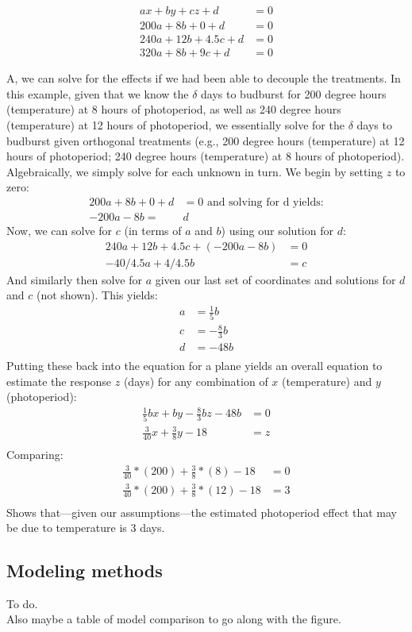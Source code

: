\documentclass[11pt]{article}
\begin{document}
\begin{align}
ax+by+cz+d & =0\\
200a + 8b + 0 + d &= 0\\
240a + 12b+4.5c + d &=0\\
320a + 8b + 9c+ d &=0
\end{align}

A, we can solve for the effects if we had been able to decouple the treatments. In this example, given that we know the $\delta$ days to budburst for 200 degree hours (temperature) at 8 hours of photoperiod, as well as 240 degree hours (temperature) at 12 hours of photoperiod, we essentially solve for the $\delta$ days to budburst given orthogonal treatments (e.g., 200 degree hours (temperature) at 12 hours of photoperiod; 240 degree hours (temperature) at 8 hours of photoperiod). \\

Algebraically, we simply solve for each unknown in turn. We begin by setting $z$ to zero:
\begin{align}
200a + 8b + 0 + d & = 0 \text{ and solving for d yields:} \\
-200a - 8b = & d  %
\end{align}
Now, we can solve for $c$ (in terms of $a$ and $b$) using our solution for $d$:
\begin{align}
240a+12b+4.5c+(-200a - 8b) &=0\\
-40/4.5a+4/4.5b & = c%
\end{align}
And similarly then solve for $a$ given our last set of coordinates and solutions for $d$ and $c$ (not shown). This yields:
\begin{align}
a & =\frac{1}{5}b\\
c & =-\frac{8}{3}b\\
d & =-48b\\
\end{align}
Putting these back into the equation for a plane yields an overall equation to estimate the response $z$ (days) for any combination of $x$ (temperature) and $y$ (photoperiod):
\begin{align}
\frac{1}{5}bx + by -\frac{8}{3}bz -48b&=0\\
\frac{3}{40}x + \frac{3}{8}y-18 & = z\\
\end{align}
Comparing:
\begin{align}
\frac{3}{40}*(200) + \frac{3}{8}*(8)-18 &=0\\ 
\frac{3}{40}*(200) + \frac{3}{8}*(12)-18 &=3\\ 
\end{align}
Shows that---given our assumptions---the estimated photoperiod effect that may be due to temperature is 3 days. 


\subsection{Modeling methods}
To do.\\
Also maybe a table of model comparison to go along with the figure.
\maketitle
\end{document}
